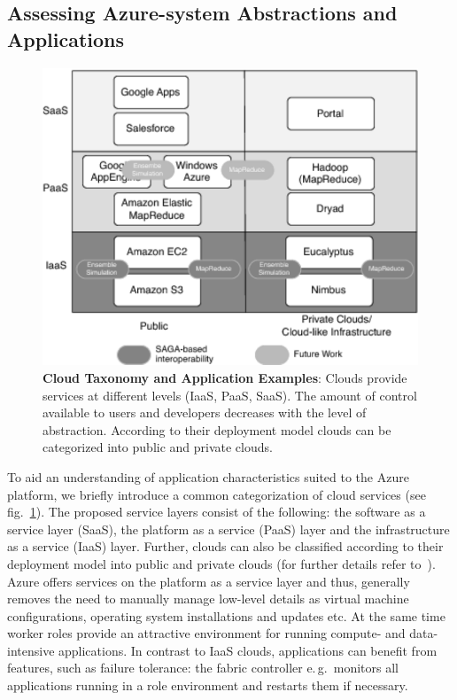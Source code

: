 \documentclass[graybox]{svmult}
\begin{document}
\subsection{Assessing Azure-system Abstractions and Applications}
\begin{figure}[ht]
 \centering
 \upp\upp
 \includegraphics[width=1.0\textwidth]{figures/cloud_ontology_apps-gray}
 \caption{\footnotesize \textbf{Cloud Taxonomy and Application Examples}:
   Clouds provide services at different levels (IaaS, PaaS, SaaS).
   The amount of control available to users and developers decreases
   with the level of abstraction. According to their deployment model
   clouds can be categorized into public and private clouds.
   \label{fig:cloud_layers}}
   \upp\upp
\end{figure}

To aid an understanding of application characteristics suited to the
Azure platform, we briefly introduce a common categorization of cloud
services (see fig.~\ref{fig:cloud_layers}). The proposed service
layers consist of the following: the software as a service layer
(SaaS), the platform as a service (PaaS) layer and the infrastructure
as a service (IaaS) layer. Further, clouds can also be classified
according to their deployment model into public and private clouds
(for further details refer to~\cite{Jha:2010kx}).  Azure offers
services on the platform as a service layer and thus, generally
removes the need to manually manage low-level details as virtual
machine configurations, operating system installations and updates
etc.  At the same time worker roles provide an attractive environment
for running compute- and data-intensive applications. In contrast to
IaaS clouds, applications can benefit from features, such as failure
tolerance: the fabric controller e.\,g.\ monitors all applications
running in a role environment and restarts them if necessary.
\end{document}
